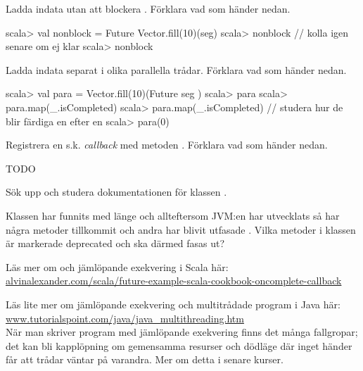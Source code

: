 \Subtask Ladda indata utan att blockera . Förklara vad som händer nedan.
\begin{REPL}
scala> val nonblock = Future{ Vector.fill(10)(seg) }
scala> nonblock   // kolla igen senare om ej klar
scala> nonblock  
\end{REPL}

\Subtask Ladda indata separat i olika parallella trådar. Förklara vad som händer nedan.
\begin{REPL}
scala> val para = Vector.fill(10)(Future{ seg })
scala> para
scala> para.map(_.isCompleted)   
scala> para.map(_.isCompleted) // studera hur de blir färdiga en efter en
scala> para(0)
\end{REPL}

\Subtask Registrera en s.k. \emph{callback} med metoden . Förklara vad som händer nedan.



\ExtraTasks %
  
\Task TODO  %

\AdvancedTasks %

\Task Sök upp och studera dokumentationen för klassen .

\Subtask Klassen  har funnits med länge och allteftersom JVM:en har utvecklats så har några metoder tillkommit och andra har blivit utfasade . Vilka metoder i klassen  är markerade deprecated och ska därmed fasas ut?

\Subtask Läs mer om  och jämlöpande exekvering i Scala här:\\
\href{http://alvinalexander.com/scala/future-example-scala-cookbook-oncomplete-callback}{alvinalexander.com/scala/future-example-scala-cookbook-oncomplete-callback}

\Subtask Läs lite mer om jämlöpande exekvering och multitrådade program i Java här: \href{http://www.tutorialspoint.com/java/java_multithreading.htm}{www.tutorialspoint.com/java/java\_multithreading.htm}  \\
\noindent När man skriver program med jämlöpande exekvering finns det många fallgropar; det kan bli kapplöpning  om gemensamma resurser och dödläge  där inget händer får att trådar väntar på varandra. Mer om detta i senare kurser. 
